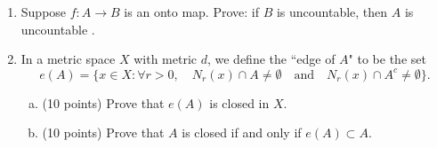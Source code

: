 \documentclass{amsart}
\newtheorem{theorem}{Theorem}
\newtheorem{lemma}[theorem]{Lemma}
\begin{document}
\begin{enumerate}[1.]
\begin{lemma}
	If $a \geq 0$, then 
	\[
		\frac{a}{1+a} \leq a
	\]
	\begin{proof}
		Consider:
		\begin{align*}
			a &\geq 0 \\
			a^2 &\geq 0 \\
			a + a^2 &\geq a \\
			a(1 + a) &\geq a \\
			a &\geq \frac{a}{1 + a} \\
			\frac{a}{1 + a} &\leq a
		\end{align*}
	\end{proof}
\end{lemma}
\begin{theorem}
	If $U$ is an open set in $(\mathbb{R},d_\infty)$, then $U$ is an open set in $(\mathbb{R},d)$.
	\begin{proof}
		We will use the notation
		\[
			N_{d,\epsilon}(x) \text{ to mean } \{ y: d(x, y) < \epsilon\}	
		\]
		Note: $U$ is an open set in $(\mathbb{R},d_\infty)$ means that for every $x \in U$ there exists an
		$\epsilon > 0$ such that $N_{d_\infty,\epsilon}(x) \subseteq U$.
		First, assume $U$ is an open set in $(\mathbb{R},d_\infty)$. Then pick an arbitrary $x \in U$ and fix $\epsilon > 0$ such that
		\[
			N_{d_\infty,\epsilon}(x) \subseteq U
		\]
		Take any element $y \in N_{d_\infty,\epsilon}(x)$. Then
		\[
			|x - y| < \epsilon	
		\]
		But we know from Lemma 13 that
		\[
			\frac{|x - y|}{1 + |x - y|} \leq |x - y|
		\]
		So 
		\begin{align*}
			\frac{|x - y|}{1 + |x - y|} < \epsilon \\
			y \in N_{d,\epsilon}(x)
		\end{align*}
		Thus, $N_{d,\epsilon}(x) \subseteq N_{d_\infty,\epsilon}(x) \subseteq U$. So 
		By universal generalization, $U$ is an open set in $(\mathbb{R},d)$.
	\end{proof}
\end{theorem}
\newpage
\item Suppose $f: A \to B$ is an onto map. Prove: if $B$ is uncountable, then $A$ is uncountable .

\newpage
\item In a metric space $X$ with metric $d$, we define the ``edge of $A$" to be the set
\[ e(A)=\{ x\in X : \forall r >0, \quad N_r(x)\cap A\neq \emptyset \quad \text{and} \quad N_r(x)\cap A^c \neq \emptyset   \}.\]
\begin{enumerate}[(a)]
	\item (10 points) Prove that $e(A)$ is closed in $X$.
	\item (10 points) Prove that $A$ is closed if and only if $e(A)\subset A$.
\end{enumerate}


\end{enumerate}
\end{document}
